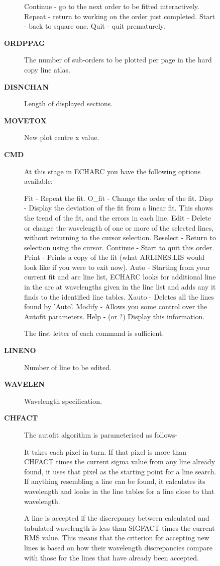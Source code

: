 \begin{description}
\begin{description}
\begin{description}
   Continue - go to the next order to be fitted interactively.
   Repeat   - return to working on the order just completed.
   Start    - back to square one.
   Quit     - quit prematurely.
\item [\textbf{ORDPPAG}]
 The number of sub-orders to be plotted per page in the hard copy
 line atlas.
\item [\textbf{DISNCHAN}]
 Length of displayed sections.
\item [\textbf{MOVETOX}]
 New plot centre x value.
\item [\textbf{CMD}]
 At this stage in ECHARC you have the following options available:

   Fit      - Repeat the fit.
   O\_fit   - Change the order of the fit.
   Disp     - Display the deviation of the fit from a linear fit.
              This shows the trend of the fit, and the errors in
              each line.
   Edit     - Delete or change the wavelength of one or more of
              the selected lines, without returning to the cursor
              selection.
   Reselect - Return to selection using the cursor.
   Continue - Start to quit this order.
   Print    - Prints a copy of the fit (what ARLINES.LIS would
              look like if you were to exit now).
   Auto     - Starting from your current fit and arc line list,
              ECHARC looks for additional line in the arc at
              wavelengths given in the line list and adds any it
              finds to the identified line tables.
   Xauto    - Deletes all the lines found by 'Auto'.
   Modify   - Allows you some control over the Autofit parameters.
   Help     - (or ?) Display this information.

 The first letter of each command is sufficient.
\item [\textbf{LINENO}]
 Number of line to be edited.
\item [\textbf{WAVELEN}]
 Wavelength specification.
\item [\textbf{CHFACT}]
 The autofit algorithm is parameterised as follows-

   It takes each pixel in turn.  If that pixel is more than CHFACT
   times the current sigma value from any line already found, it uses
   that pixel as the starting point for a line search.  If anything
   resembling a line can be found, it calculates its wavelength and
   looks in the line tables for a line close to that wavelength.

   A line is accepted if the discrepancy between calculated and
   tabulated wavelength is less than SIGFACT times the current RMS
   value.  This means that the criterion for accepting new lines
   is based on how their wavelength discrepancies compare with those for
   the lines that have already been accepted.


\end{description}
\end{description}
\end{description}
